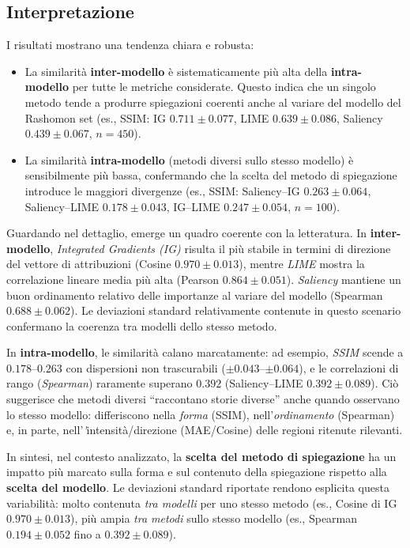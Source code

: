 \documentclass[12pt,a4paper,oneside]{report}
\numberwithin{figure}{chapter}
\numberwithin{table}{chapter}
\begin{document}
\subsection{Interpretazione}
I risultati mostrano una tendenza chiara e robusta:
\begin{itemize}
      \item La similarità \textbf{inter-modello} è sistematicamente più alta della
            \textbf{intra-modello} per tutte le metriche considerate. Questo indica che un
            singolo metodo tende a produrre spiegazioni coerenti anche al variare del
            modello del Rashomon set (es., SSIM: IG $0.711 \pm 0.077$, LIME $0.639 \pm
                  0.086$, Saliency $0.439 \pm 0.067$, $n=450$).
      \item La similarità \textbf{intra-modello} (metodi diversi sullo stesso modello) è
            sensibilmente più bassa, confermando che la scelta del metodo di spiegazione
            introduce le maggiori divergenze (es., SSIM: Saliency--IG $0.263 \pm 0.064$,
            Saliency--LIME $0.178 \pm 0.043$, IG--LIME $0.247 \pm 0.054$, $n=100$).
\end{itemize}

Guardando nel dettaglio, emerge un quadro coerente con la letteratura. In
\textbf{inter-modello}, \emph{Integrated Gradients (IG)} risulta il più stabile
in termini di direzione del vettore di attribuzioni (Cosine $0.970 \pm 0.013$),
mentre \emph{LIME} mostra la correlazione lineare media più alta (Pearson
$0.864 \pm 0.051$). \emph{Saliency} mantiene un buon ordinamento relativo delle
importanze al variare del modello (Spearman $0.688 \pm 0.062$). Le deviazioni
standard relativamente contenute in questo scenario confermano la coerenza tra
modelli dello stesso metodo.

In \textbf{intra-modello}, le similarità calano marcatamente: ad esempio,
\emph{SSIM} scende a $0.178$--$0.263$ con dispersioni non trascurabili ($\pm
      0.043$--$\pm 0.064$), e le correlazioni di rango (\emph{Spearman}) raramente
superano $0.392$ (Saliency--LIME $0.392 \pm 0.089$). Ciò suggerisce che metodi
diversi “raccontano storie diverse” anche quando osservano lo stesso modello:
differiscono nella \emph{forma} (SSIM), nell’\emph{ordinamento} (Spearman) e,
in parte, nell'\emph'{intensità/direzione} (MAE/Cosine) delle regioni ritenute
rilevanti.

In sintesi, nel contesto analizzato, la \textbf{scelta del metodo di
      spiegazione} ha un impatto più marcato sulla forma e sul contenuto della
spiegazione rispetto alla \textbf{scelta del modello}. Le deviazioni standard
riportate rendono esplicita questa variabilità: molto contenuta \emph{tra
      modelli} per uno stesso metodo (es., Cosine di IG $0.970 \pm 0.013$), più ampia
\emph{tra metodi} sullo stesso modello (es., Spearman $0.194 \pm 0.052$ fino a
$0.392 \pm 0.089$).
\end{document}
